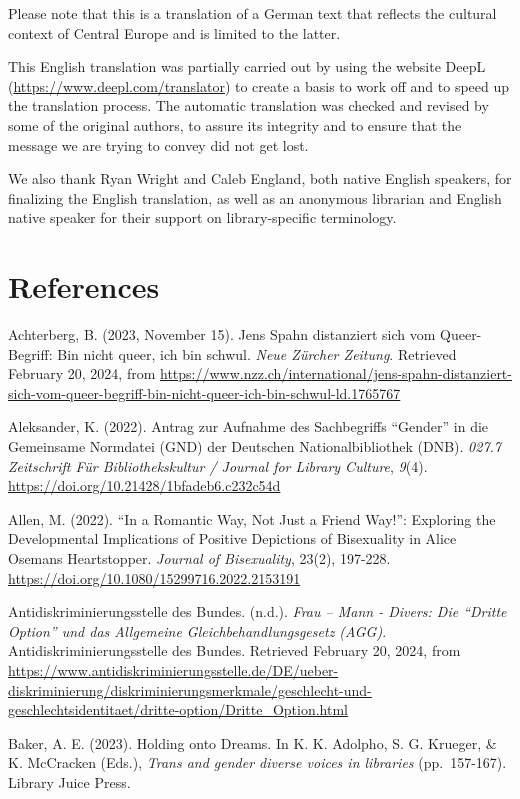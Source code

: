 \documentclass[a4paper,
fontsize=11pt,
oneside,
numbers=noperiodatend,
parskip=half-,
bibliography=totoc,
final
]{scrartcl}
\begin{document}
Please note that this is a translation of a German text that reflects
the cultural context of Central Europe and is limited to the latter.

This English translation was partially carried out by using the website
DeepL (\url{https://www.deepl.com/translator}) to create a basis to work
off and to speed up the translation process. The automatic translation
was checked and revised by some of the original authors, to assure its
integrity and to ensure that the message we are trying to convey did not
get lost.

We also thank Ryan Wright and Caleb England, both native English
speakers, for finalizing the English translation, as well as an
anonymous librarian and English native speaker for their support on
library-specific terminology.

\hypertarget{references}{%
\section{References}\label{references}}

Achterberg, B. (2023, November 15). Jens Spahn distanziert sich vom
Queer-Begriff: Bin nicht queer, ich bin schwul. \emph{Neue Zürcher
Zeitung}. Retrieved February 20, 2024, from
\url{https://www.nzz.ch/international/jens-spahn-distanziert-sich-vom-queer-begriff-bin-nicht-queer-ich-bin-schwul-ld.1765767}

Aleksander, K. (2022). Antrag zur Aufnahme des Sachbegriffs
\enquote{Gender} in die Gemeinsame Normdatei (GND) der Deutschen
Nationalbibliothek (DNB). \emph{027.7 Zeitschrift Für Bibliothekskultur
/ Journal for Library Culture}, \emph{9}(4).
\url{https://doi.org/10.21428/1bfadeb6.c232c54d}

Allen, M. (2022). \enquote{In a Romantic Way, Not Just a Friend Way!}: Exploring
the Developmental Implications of Positive Depictions of Bisexuality in
Alice Oseman\textquotesingle s Heartstopper. \emph{Journal of
Bisexuality}, 23(2), 197-228.
\url{https://doi.org/10.1080/15299716.2022.2153191}

Antidiskriminierungsstelle des Bundes. (n.d.). \emph{Frau -- Mann -
Divers: Die \enquote{Dritte Option} und das Allgemeine
Gleichbehandlungsgesetz (AGG)}. Antidiskriminierungsstelle des Bundes.
Retrieved February 20, 2024, from
\url{https://www.antidiskriminierungsstelle.de/DE/ueber-diskriminierung/diskriminierungsmerkmale/geschlecht-und-geschlechtsidentitaet/dritte-option/Dritte_Option.html}

Baker, A. E. (2023). Holding onto Dreams. In K. K. Adolpho, S. G.
Krueger, \& K. McCracken (Eds.), \emph{Trans and gender diverse voices
in libraries} (pp.~157-167). Library Juice Press.
\end{document}
